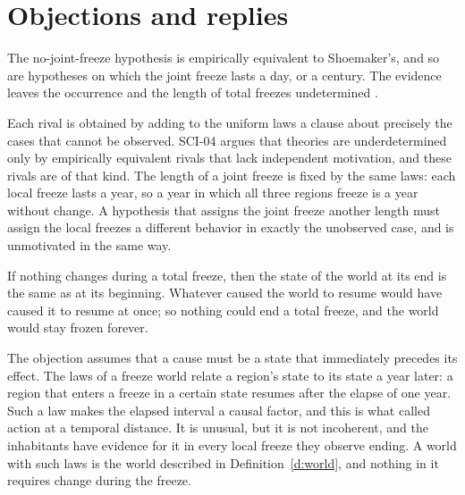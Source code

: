 \documentclass{situationist-preprint}
\begin{document}
\section{Objections and replies}

\begin{objection}[Underdetermination]
The no-joint-freeze hypothesis is empirically equivalent to Shoemaker's, and so are hypotheses on which the joint freeze lasts a day, or a century. The evidence leaves the occurrence and the length of total freezes undetermined \citep{NewtonSmith1980}.
\end{objection}

\begin{reply}
Each rival is obtained by adding to the uniform laws a clause about precisely the cases that cannot be observed. SCI-04 argues that theories are underdetermined only by empirically equivalent rivals that lack independent motivation, and these rivals are of that kind. The length of a joint freeze is fixed by the same laws: each local freeze lasts a year, so a year in which all three regions freeze is a year without change. A hypothesis that assigns the joint freeze another length must assign the local freezes a different behavior in exactly the unobserved case, and is unmotivated in the same way.
\end{reply}

\begin{objection}
If nothing changes during a total freeze, then the state of the world at its end is the same as at its beginning. Whatever caused the world to resume would have caused it to resume at once; so nothing could end a total freeze, and the world would stay frozen forever.
\end{objection}

\begin{reply}
The objection assumes that a cause must be a state that immediately precedes its effect. The laws of a freeze world relate a region's state to its state a year later: a region that enters a freeze in a certain state resumes after the elapse of one year. Such a law makes the elapsed interval a causal factor, and this is what \citet{Shoemaker1969} called action at a temporal distance. It is unusual, but it is not incoherent, and the inhabitants have evidence for it in every local freeze they observe ending. A world with such laws is the world described in Definition~\ref{d:world}, and nothing in it requires change during the freeze.
\end{reply}
\end{document}
